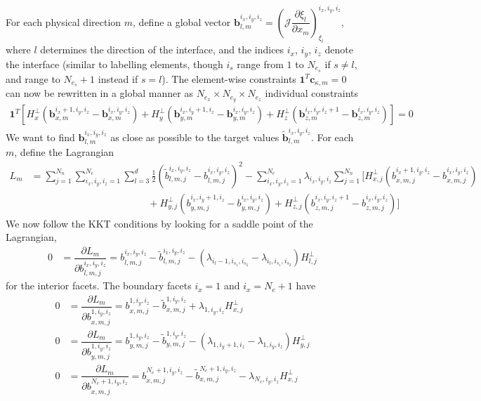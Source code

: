\documentclass[12pt,a4paper]{article}
\newcommand{\pder}[2][]{\dfrac{\partial #1}{\partial #2}} %
\newcommand{\fn}[1]{\mathcal{#1}} %
\begin{document}
For each physical direction $m$, define a global vector $\bm{b}_{l,m}^{i_x,i_y,i_z} =  \left( \fn{J} \pder[\xi_l]{x_m} \right)_{\xi_l}^{i_x,i_y,i_z}$, where $l$ determines the direction of the interface, and the indices $i_x$, $i_y$, $i_z$ denote the interface (similar to labelling elements, though $i_s$ range from $1$ to $N_{e_s}$ if $s \neq l$, and range to $N_{e_s}+ 1$ instead if $s=l$). The element-wise constraints $\bm{1}^T \bm{c}_{\kappa , m} = 0$ can now be rewritten in a global manner as $N_{e_x} \times N_{e_y} \times N_{e_z}$ individual constraints 
\begin{align*}
\bm{1}^T \left[ H^\bot_{x} \left( \bm{b}_{x,m}^{i_x+1,i_y,i_z} - \bm{b}_{x,m}^{i_x,i_y,i_z} \right) + H^\bot_{y} \left( \bm{b}_{y,m}^{i_x,i_y+1,i_z} - \bm{b}_{y,m}^{i_x,i_y,i_z} \right) + H^\bot_{z} \left( \bm{b}_{z,m}^{i_x,i_y,i_z+1} - \bm{b}_{z,m}^{i_x,i_y,i_z} \right) \right] = 0
\end{align*}
We want to find $\bm{b}_{l,m}^{i_x,i_y,i_z}$ as close as possible to the target values $\tilde{\bm{b}}_{l,m}^{i_x,i_y,i_z}$. For each $m$, define the Lagrangian
\begin{align*}
L_m &= \sum_{j=1}^{N_n} \sum_{i_x,i_y,i_z=1}^{N_e} \sum_{l=3}^d \frac{1}{2} \left( \tilde{b}_{l,m,j}^{i_x,i_y,i_z} - b^{i_x,i_y,i_z}_{l,m,j} \right)^2 -  \sum_{i_x,i_y,i_z=1}^{N_e} \lambda_{i_x,i_y,i_z} \sum_{j=1}^{N_n} \Big[ H^\bot_{x,j} \left( b_{x,m,j}^{i_x+1,i_y,i_z} - b_{x,m,j}^{i_x,i_y,i_z} \right) \\
&\hspace{5cm} + H^\bot_{y,j} \left( b_{y,m,j}^{i_x,i_y+1,i_z} - b_{y,m,j}^{i_x,i_y,i_z} \right) + H^\bot_{z,j} \left( b_{z,m,j}^{i_x,i_y,i_z+1} - b_{z,m,j}^{i_x,i_y,i_z} \right) \Big]
\end{align*}
We now follow the KKT conditions by looking for a saddle point of the Lagrangian,
\begin{align*}
0 &= \pder[L_m]{b^{i_x,i_y,i_z}_{l,m,j}} = b_{l,m,j}^{i_x,i_y,i_z}  -  \tilde{b}^{i_x,i_y,i_z}_{l,m,j}  - \left( \lambda_{i_l-1,i_{s_1},i_{s_2}} -  \lambda_{i_l,i_{s_1},i_{s_2}} \right) H_{l, j}^\bot
\end{align*}
for the interior facets. The boundary facets $i_x =1$ and $i_x = N_e+1$ have
\begin{align*}
0 &= \pder[L_m]{b^{1,i_y,i_z}_{x,m,j}} = b_{x,m,j}^{1,i_y,i_z}  -  \tilde{b}^{1,i_y,i_z}_{x,m,j}  + \lambda_{1,i_y,i_z} H_{x , j}^\bot  \\
0 &= \pder[L_m]{b^{1,i_y,i_z}_{y,m,j}} = b_{y,m,j}^{1,i_y,i_z}  -  \tilde{b}^{1,i_y,i_z}_{y,m,j}  - \left( \lambda_{1,i_y+1,i_z} - \lambda_{1,i_y,i_z}  \right)H_{y , j}^\bot  \\
0 &= \pder[L_m]{b^{N_e+1,i_y,i_z}_{x,m,j}} = b_{x,m,j}^{N_e+1,i_y,i_z}  -  \tilde{b}^{N_e+1,i_y,i_z}_{x,m,j}  - \lambda_{N_e,i_y,i_z} H_{x , j}^\bot  
\end{align*}
\end{document}

